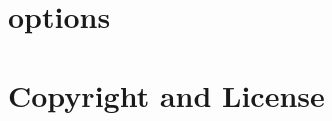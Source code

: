 \documentclass[pdf,12pt,report]{SANDreport}
\begin{document}
    \chapter{\muelu{} options} \label{sec:options}
    


    \clearpage
    \providecommand*{\phantomsection}{}
    \phantomsection
    
    


    \appendix
    \chapter{Copyright and License}
    




    
\end{document}

